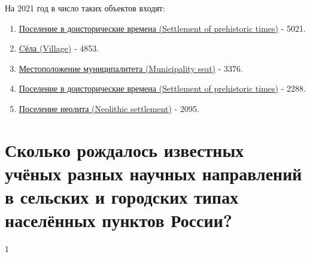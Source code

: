 На 2021 год в число таких объектов входят:
\begin{enumerate} 
  \item \href{http://www.wikidata.org/entity/Q106505070}{Поселение в доисторические времена (Settlement of prehistoric times)} - \num{5021}.
  \item \href{http://www.wikidata.org/entity/Q532}{Cёла (Village)} - \num{4853}.
  \item \href{http://www.wikidata.org/entity/Q15303838}{Местоположение муниципалитета (Municipality seat)} - \num{3376}.
  \item \href{http://www.wikidata.org/entity/Q106492558}{Поселение в доисторические времена (Settlement of prehistoric times)} - \num{2288}.
  \item \href{http://www.wikidata.org/entity/Q106491339}{Поселение неолита (Neolithic settlement)} - \num{2095}.
\end{enumerate}

\section{Сколько рождалось известных учёных разных научных направлений в сельских и городских типах населённых пунктов России?}

1
